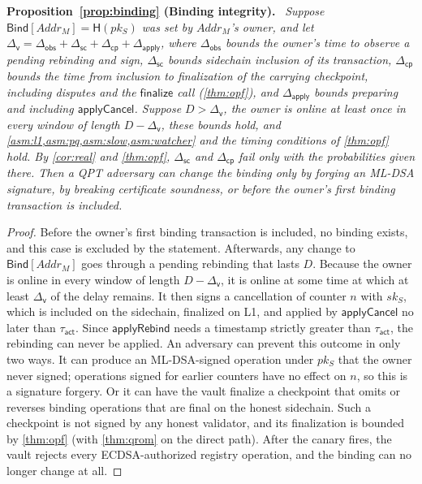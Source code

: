 \documentclass[10pt,journal,compsoc]{IEEEtran}
\theoremstyle{tplain}
\theoremstyle{tdef}
\theoremstyle{remark}
\newcommand{\Hash}{\mathsf{H}}
\newenvironment{restate}[1]{\par\smallskip\noindent\textbf{#1.}\ \itshape\ignorespaces}{\par\smallskip}
\begin{document}
\begin{restate}{Proposition~\ref{prop:binding} (Binding integrity)}
Suppose $\mathsf{Bind}[\mathit{Addr}_M]=\Hash(pk_S)$ was set by $\mathit{Addr}_M$'s owner, and let $\Delta_{\mathsf{v}}=\Delta_{\mathsf{obs}}+\Delta_{\mathsf{sc}}+\Delta_{\mathsf{cp}}+\Delta_{\mathsf{apply}}$, where $\Delta_{\mathsf{obs}}$ bounds the owner's time to observe a pending rebinding and sign, $\Delta_{\mathsf{sc}}$ bounds sidechain inclusion of its transaction, $\Delta_{\mathsf{cp}}$ bounds the time from inclusion to finalization of the carrying checkpoint, including disputes and the $\mathsf{finalize}$ call (\cref{thm:opf}), and $\Delta_{\mathsf{apply}}$ bounds preparing and including $\mathsf{applyCancel}$. Suppose $D>\Delta_{\mathsf{v}}$, the owner is online at least once in every window of length $D-\Delta_{\mathsf{v}}$, these bounds hold, and \cref{asm:l1,asm:pq,asm:slow,asm:watcher} and the timing conditions of \cref{thm:opf} hold. By \cref{cor:real} and \cref{thm:opf}, $\Delta_{\mathsf{sc}}$ and $\Delta_{\mathsf{cp}}$ fail only with the probabilities given there. Then a QPT adversary can change the binding only by forging an ML-DSA signature, by breaking certificate soundness, or before the owner's first binding transaction is included.
\end{restate}
\begin{proof}
Before the owner's first binding transaction is included, no binding exists, and this case is excluded by the statement. Afterwards, any change to $\mathsf{Bind}[\mathit{Addr}_M]$ goes through a pending rebinding that lasts $D$. Because the owner is online in every window of length $D-\Delta_{\mathsf{v}}$, it is online at some time at which at least $\Delta_{\mathsf{v}}$ of the delay remains. It then signs a cancellation of counter $n$ with $sk_S$, which is included on the sidechain, finalized on L1, and applied by $\mathsf{applyCancel}$ no later than $\tau_{\mathsf{act}}$. Since $\mathsf{applyRebind}$ needs a timestamp strictly greater than $\tau_{\mathsf{act}}$, the rebinding can never be applied. An adversary can prevent this outcome in only two ways. It can produce an ML-DSA-signed operation under $pk_S$ that the owner never signed; operations signed for earlier counters have no effect on $n$, so this is a signature forgery. Or it can have the vault finalize a checkpoint that omits or reverses binding operations that are final on the honest sidechain. Such a checkpoint is not signed by any honest validator, and its finalization is bounded by \cref{thm:opf} (with \cref{thm:qrom} on the direct path). After the canary fires, the vault rejects every ECDSA-authorized registry operation, and the binding can no longer change at all.
\end{proof}
\end{document}
